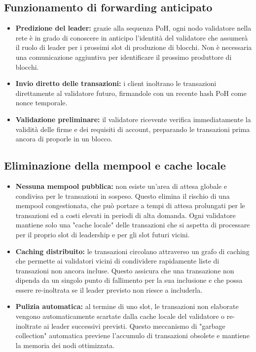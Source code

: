 \documentclass[a4paper,12pt]{report}
\begin{document}
	\subsection{Funzionamento di forwarding anticipato}
	\begin{itemize}
		\item \textbf{Predizione del leader:} grazie alla sequenza PoH, ogni nodo validatore nella rete è in grado di conoscere in anticipo l'identità del validatore che assumerà il ruolo di leader per i prossimi slot di produzione di blocchi. Non è necessaria una comunicazione aggiuntiva per identificare il prossimo produttore di blocchi.
		\item \textbf{Invio diretto delle transazioni:} i client inoltrano le transazioni direttamente al validatore futuro, firmandole con un recente hash PoH come nonce temporale.
		\item \textbf{Validazione preliminare:} il validatore ricevente verifica immediatamente la validità delle firme e dei requisiti di account, preparando le transazioni prima ancora di proporle in un blocco.
	\end{itemize}
	
	\subsection{Eliminazione della mempool e cache locale}
	\begin{itemize}
		\item \textbf{Nessuna mempool pubblica:} non esiste un'area di attesa globale e condivisa per le transazioni in sospeso. Questo elimina il rischio di una mempool congestionata, che può portare a tempi di attesa prolungati per le transazioni ed a costi elevati in periodi di alta domanda. Ogni validatore mantiene solo una "cache locale" delle transazioni che si aspetta di processare per il proprio slot di leadership e per gli slot futuri vicini.
		\item \textbf{Caching distribuito:} le transazioni circolano attraverso un grafo di caching che permette ai validatori vicini di condividere rapidamente liste di transazioni non ancora incluse. Questo assicura che una transazione non dipenda da un singolo punto di fallimento per la sua inclusione e che possa essere re-inoltrata se il leader previsto non riesce a includerla.
		\item \textbf{Pulizia automatica:} al termine di uno slot, le transazioni non elaborate vengono automaticamente scartate dalla cache locale del validatore o re-inoltrate ai leader successivi previsti. Questo meccanismo di "garbage collection" automatica previene l'accumulo di transazioni obsolete e mantiene la memoria dei nodi ottimizzata.
	\end{itemize}
	
\end{document}
